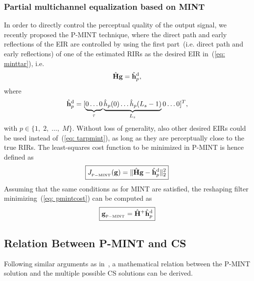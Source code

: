 \documentclass[10pt]{IEEEtran}
\begin{document}
\subsubsection*{Partial multichannel equalization based on MINT~\cite{Kodrasi_ICASSP_2012}}
In order to directly control the perceptual quality of the output signal, we recently proposed the P-MINT technique, where the direct path and early reflections of the EIR are controlled by using the first part~(i.e. direct path and early reflections) of one of the estimated RIRs as the desired EIR in~(\ref{eq: minttar}), i.e.
\begin{equation}
\label{eq: PMINT}
\hat{\mathbf{H}} \mathbf{g} = \hat{\mathbf{h}}_{p}^{\rm d},
\end{equation}
where
\begin{equation}
\label{eq: tarpmint}
\hat{\mathbf{h}}_{p}^{\rm d} = [\underbrace{0\phantom{\rlap{$(L_s-1)$}} \ldots 0 }_{\tau} \underbrace{\hat{h}_p(0) \ldots \hat{h}_p(L_s-1)}_{L_s} 0 \ldots 0 ]^{T},
\end{equation}
with $p \in \{1, \; 2, \; \ldots, \; M \}$.
Without loss of generality, also other desired EIRs could be used instead of~(\ref{eq: tarpmint}), as long as they are perceptually close to the true RIRs.
The least-squares cost function to be minimized in P-MINT is hence defined as
\begin{equation}
\label{eq: pmintcost}
\boxed{J_{_{\rm P-MINT}}(\mathbf{g}) = \|\hat{\mathbf{H}}\mathbf{g} - \hat{\mathbf{h}}_p^{\rm d}\|_2^2}
\end{equation}
Assuming that the same conditions as for MINT are satisfied, the reshaping filter minimizing~(\ref{eq: pmintcost}) can be computed as
\begin{equation}
\label{eq: Pmintsol}
\boxed{\mathbf{g}_{{}_{\rm P-MINT}} = \hat{\mathbf{H}}^{+}\hat{\mathbf{h}}_p^{\rm d}}
\end{equation}

\subsection{Relation Between P-MINT and CS}
\label{sec: pmint_and_cs}
Following similar arguments as in~\cite{Zhang_IWAENC_2010}, a mathematical relation between the P-MINT solution and the multiple possible CS solutions can be derived.
\end{document}
